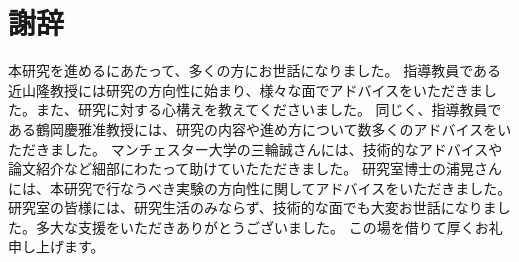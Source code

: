 \documentclass[a4, 10pt,dvipdfmx]{jsarticle}
\begin{document}


\newpage
\section*{謝辞}

本研究を進めるにあたって、多くの方にお世話になりました。
指導教員である近山隆教授には研究の方向性に始まり、様々な面でアドバイスをいただきました。また、研究に対する心構えを教えてくださいました。
同じく、指導教員である鶴岡慶雅准教授には、研究の内容や進め方について数多くのアドバイスをいただきました。
マンチェスター大学の三輪誠さんには、技術的なアドバイスや論文紹介など細部にわたって助けていたただきました。
研究室博士の浦晃さんには、本研究で行なうべき実験の方向性に関してアドバイスをいただきました。  
研究室の皆様には、研究生活のみならず、技術的な面でも大変お世話になりました。多大な支援をいただきありがとうございました。
この場を借りて厚くお礼申し上げます。

\newpage


\end{document}
